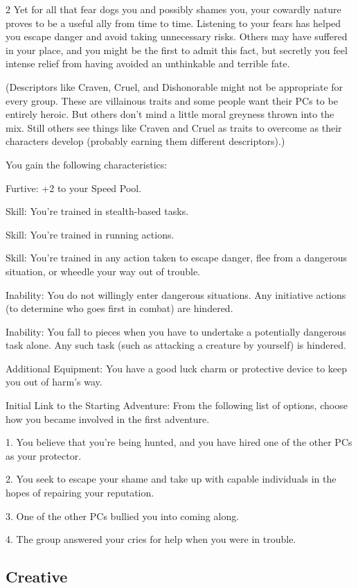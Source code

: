 \begin{multicols}{2}
Yet for all that fear dogs you and possibly shames you, your cowardly nature proves to be a useful ally from time to time. Listening to your fears has helped you escape danger and avoid taking unnecessary risks. Others may have suffered in your place, and you might be the first to admit this fact, but secretly you feel intense relief from having avoided an unthinkable and terrible fate.

(Descriptors like Craven, Cruel, and Dishonorable might not be appropriate for every group. These are villainous traits and some people want their PCs to be entirely heroic. But others don’t mind a little moral greyness thrown into the mix. Still others see things like Craven and Cruel as traits to overcome as their characters develop (probably earning them different descriptors).)

You gain the following characteristics:

Furtive: +2 to your Speed Pool.

Skill: You’re trained in stealth-based tasks.

Skill: You’re trained in running actions.

Skill: You’re trained in any action taken to escape danger, flee from a dangerous situation, or wheedle your way out of trouble.

Inability: You do not willingly enter dangerous situations. Any initiative actions (to determine who goes first in combat) are hindered.

Inability: You fall to pieces when you have to undertake a potentially dangerous task alone. Any such task (such as attacking a creature by yourself) is hindered.

Additional Equipment: You have a good luck charm or protective device to keep you out of harm’s way.

Initial Link to the Starting Adventure: From the following list of options, choose how you became involved in the first adventure.

1. You believe that you’re being hunted, and you have hired one of the other PCs as your protector.

2. You seek to escape your shame and take up with capable individuals in the hopes of repairing your reputation. 

3. One of the other PCs bullied you into coming along.

4. The group answered your cries for help when you were in trouble.

\subsection{Creative}


\end{multicols}
